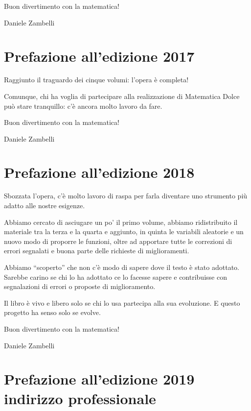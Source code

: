 Buon divertimento con la matematica!

\begin{flushright}
Daniele Zambelli
\end{flushright}

\section{Prefazione all'edizione 2017}

Raggiunto il traguardo dei cinque volumi: l'opera è completa!

Comunque, chi ha voglia di partecipare alla realizzazione di Matematica Dolce
può stare tranquillo:
c'è ancora molto lavoro da fare.

Buon divertimento con la matematica!

\begin{flushright}
Daniele Zambelli
\end{flushright}

\section{Prefazione all'edizione 2018}

Sbozzata l'opera, c'è molto lavoro di raspa per farla diventare uno
strumento più adatto alle nostre esigenze.

Abbiamo cercato di asciugare un po' il primo volume, abbiamo ridistribuito
il materiale tra la terza e la quarta e aggiunto, in quinta le variabili
aleatorie e un nuovo modo di proporre le funzioni,
oltre ad apportare tutte le correzioni di errori segnalati e buona parte
delle richieste di miglioramenti.

Abbiamo ``scoperto'' che non c'è modo di sapere dove il testo è stato
adottato. Sarebbe carino se chi lo ha adottato ce lo facesse sapere e
contribuisse con segnalazioni di errori o proposte di miglioramento.

Il libro è vivo e libero solo se chi lo usa partecipa alla sua evoluzione.
E questo progetto ha senso solo se evolve.

Buon divertimento con la matematica!

\begin{flushright}
Daniele Zambelli
\end{flushright}


\section{Prefazione all'edizione 2019 indirizzo professionale}

